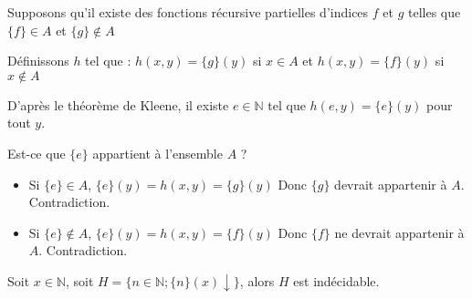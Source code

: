 Supposons qu'il existe  des fonctions récursive partielles d'indices $f$ et $g$ telles que $\{f\}\in A$
 et $\{g\} \notin A$ 

Définissons $h$ tel que :
$h(x,y)=\{g\}(y)$ si $x \in A$ et 
$h(x,y)=\{f\}(y)$ si $x \notin A$  

D'après le théorème de Kleene, il existe $e \in \mathbb{N}$ tel que $h(e,y)=\{ e \}(y)$ pour tout $y$.

Est-ce que $\{ e \}$ appartient à l'ensemble $A$ ?

\begin{itemize}
	\item Si $\{e\} \in A$, $\{e\}(y)=h(x,y)=\{g\}(y)$ 
	Donc $\{g\}$ devrait appartenir à $A$. Contradiction.

	\item Si $\{e\} \notin A$, $\{e\}(y)=h(x,y)=\{f\}(y)$ 
	Donc $\{ f\}$ ne devrait appartenir à $A$. Contradiction.
\end{itemize}

\begin{theoreme} 
Soit $x \in \mathbb{N}$, soit $H=\{ n\in \mathbb{N}; \{n\}(x) \downarrow \}$, alors $H$ est indécidable.
\end{theoreme}
